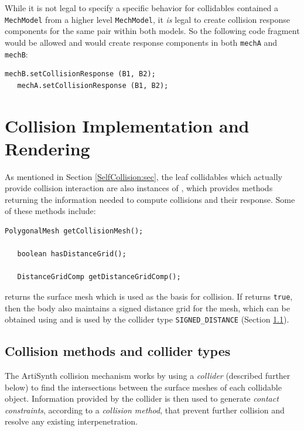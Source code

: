 While it is not legal to specify a specific behavior for collidables
contained a {\tt MechModel} from a higher level {\tt MechModel},
it {\it is} legal to create collision response components for the same
pair within both models. So the following code fragment would be
allowed and would create response components in both {\tt mechA} and
{\tt mechB}:
%
\begin{lstlisting}[]
   mechB.setCollisionResponse (B1, B2);
   mechA.setCollisionResponse (B1, B2);
\end{lstlisting}
%

\section{Collision Implementation and Rendering}
\label{CollisionImplemenetation:sec}

As mentioned in Section \ref{SelfCollision:sec}, the leaf collidables
which actually provide collision interaction are also instances of
, which provides methods
returning the information needed to compute collisions and their
response. Some of these methods include:

%
\begin{lstlisting}[]
   PolygonalMesh getCollisionMesh();

   boolean hasDistanceGrid();

   DistanceGridComp getDistanceGridComp();
\end{lstlisting}
%

returns the surface mesh which is used as the basis for collision.  If
returns {\tt true}, then the body also maintains a signed distance
grid for the mesh, which can be obtained using
 and
is used by the collider type {\tt SIGNED\_DISTANCE} (Section
\ref{CollisionMethods:sec}).

\subsection{Collision methods and collider types}
\label{CollisionMethods:sec}

The ArtiSynth collision mechanism works by using a {\it collider}
(described further below) to find the intersections between the
surface meshes of each collidable object. Information provided
by the collider is then used to generate {\it contact constraints},
according to a {\it collision method}, that prevent further collision
and resolve any existing interpenetration.

